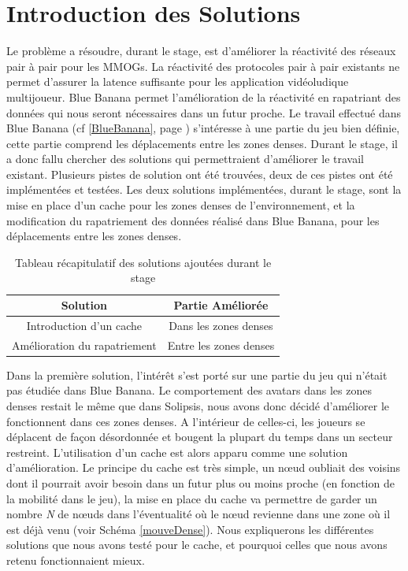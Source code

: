 \section{Introduction des Solutions}
\label{introSolutions}
	Le problème a résoudre, durant le stage, est d'améliorer la réactivité des réseaux pair à pair pour les MMOGs. La réactivité des protocoles pair à pair existants ne permet d'assurer la latence suffisante pour les application vidéoludique multijoueur. Blue Banana permet l'amélioration de la réactivité en rapatriant des données qui nous seront nécessaires dans un futur proche. Le travail effectué dans Blue Banana (cf \ref{BlueBanana}, page \pageref{BlueBanana}) s'intéresse à une partie du jeu bien définie, cette partie comprend les déplacements entre les zones denses. Durant le stage, il a donc fallu chercher des solutions qui permettraient d'améliorer le travail existant. Plusieurs pistes de solution ont été trouvées, deux de ces pistes ont été implémentées et testées. Les deux solutions implémentées, durant le stage, sont la mise en place d'un cache pour les zones denses de l'environnement, et la modification du rapatriement des données réalisé dans Blue Banana, pour les déplacements entre les zones denses.
\begin{table}[!h]
  \begin{center}
    \begin{tabular}{|c|c|}
      \hline
      Solution & Partie Améliorée \\
      \hline
      Introduction d'un cache  & Dans les zones denses \\
      Amélioration du rapatriement & Entre les zones denses \\
      \hline
    \end{tabular}
  \end{center}
  \label{tab:config2}
  \caption{Tableau récapitulatif des solutions ajoutées durant le stage}
\end{table}
\par Dans la première solution, l'intérêt s'est porté sur une partie du jeu qui n'était pas étudiée dans Blue Banana. Le comportement des avatars dans les zones denses restait le même que dans Solipsis, nous avons donc décidé d'améliorer le fonctionnent dans ces zones denses. A l'intérieur de celles-ci, les joueurs se déplacent de façon désordonnée et bougent la plupart du temps dans un secteur restreint. L'utilisation d'un cache est alors apparu comme une solution d'amélioration. Le principe du cache est très simple, un nœud oubliait des voisins dont il pourrait avoir besoin dans un futur plus ou moins proche (en fonction de la mobilité dans le jeu), la mise en place du cache va permettre de garder un nombre \textit{N} de nœuds dans l'éventualité où le nœud revienne dans une zone où il est déjà venu (voir Schéma \ref{mouveDense}). Nous expliquerons les différentes solutions que nous avons testé pour le cache, et pourquoi celles que nous avons retenu fonctionnaient mieux.
